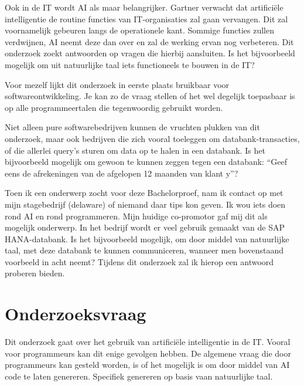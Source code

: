 Ook in de IT wordt AI als maar belangrijker. Gartner verwacht dat artificiële intelligentie de routine functies van IT-organisaties zal gaan vervangen. Dit zal voornamelijk  gebeuren langs de operationele kant. Sommige functies zullen verdwijnen, AI neemt deze dan over en zal de werking ervan nog verbeteren. Dit onderzoek zoekt antwoorden op vragen die hierbij aansluiten. Is het bijvoorbeeld mogelijk om uit natuurlijke taal iets functioneels te bouwen in de IT? 

Voor mezelf lijkt dit onderzoek in eerste plaats bruikbaar voor softwareontwikkeling. Je kan zo de vraag stellen of het wel degelijk toepasbaar is op alle programmeertalen die tegenwoordig gebruikt worden. 

Niet alleen pure softwarebedrijven kunnen de vruchten plukken van dit onderzoek, maar ook bedrijven die zich vooral toeleggen om databank-transacties, of die allerlei query's sturen om data op te halen in een databank. Is het bijvoorbeeld mogelijk om gewoon te kunnen zeggen tegen een databank: “Geef eens de afrekeningen van de afgelopen 12 maanden van klant y”?

Toen ik een onderwerp zocht voor deze Bachelorproef, nam ik contact op met mijn stagebedrijf (delaware) of niemand daar tips kon geven. Ik wou iets doen rond AI en rond programmeren. Mijn huidige co-promotor gaf mij dit als mogelijk onderwerp. In het bedrijf wordt er veel gebruik gemaakt van de SAP HANA-databank. Is het bijvoorbeeld mogelijk, om door middel van natuurlijke taal, met deze databank te kunnen communiceren, wanneer men bovenstaand voorbeeld in acht neemt? Tijdens dit onderzoek zal ik hierop een antwoord proberen bieden.

\section{Onderzoeksvraag}
\label{sec:onderzoeksvraag}

Dit onderzoek gaat over het gebruik van artificiële intelligentie in de IT. Vooral voor programmeurs kan dit enige gevolgen hebben. De algemene vraag die door programmeurs kan gesteld worden, is of het mogelijk is om door middel van AI code te laten genereren. Specifiek genereren op basis vaan natuurlijke taal. 

